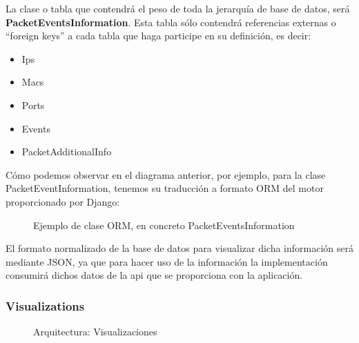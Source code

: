 La clase o tabla que contendrá el peso de toda la jerarquía de base de datos, será \textbf{PacketEventsInformation}. Esta tabla sólo contendrá referencias externas o ``foreign keys'' a cada tabla que haga participe en su definición, es decir:
\begin{itemize}
\item Ips
\item Macs
\item Ports
\item Events
\item PacketAdditionalInfo
\end{itemize}

Cómo podemos observar en el diagrama anterior, por ejemplo, para la clase PacketEventInformation, tenemos su traducción a formato ORM del motor proporcionado por Django:

\begin{figure}[H]

\caption{Ejemplo de clase ORM, en concreto PacketEventsInformation}
\end{figure}

El formato normalizado de la base de datos para visualizar dicha información será mediante JSON, ya que para hacer uso de la información la implementación consumirá dichos datos de la api que se proporciona con la aplicación.\\

\newpage
\subsubsection{Visualizations}

\begin{figure}[H]
  \caption{Arquitectura: Visualizaciones}
\end{figure}

